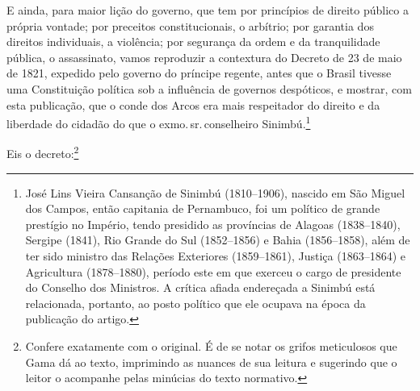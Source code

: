 E ainda, para maior lição do governo, que tem por princípios de direito
público a própria vontade; por preceitos constitucionais, o arbítrio;
por garantia dos direitos individuais, a violência; por segurança da
ordem e da tranquilidade pública, o assassinato, vamos reproduzir a
contextura do Decreto de 23 de maio de 1821, expedido pelo governo do
príncipe regente, antes que o Brasil tivesse uma Constituição política
sob a influência de governos despóticos, e mostrar, com esta publicação,
que o conde dos Arcos era mais respeitador do direito e da liberdade do
cidadão do que o exmo.\,sr.\,conselheiro Sinimbú.\footnote{José Lins
  Vieira Cansanção de Sinimbú (1810--1906), nascido em São Miguel dos
  Campos, então capitania de Pernambuco, foi um político de grande
  prestígio no Império, tendo presidido as províncias de Alagoas
  (1838--1840), Sergipe (1841), Rio Grande do Sul (1852--1856) e Bahia
  (1856--1858), além de ter sido ministro das Relações Exteriores
  (1859--1861), Justiça (1863--1864) e Agricultura (1878--1880), período
  este em que exerceu o cargo de presidente do Conselho dos Ministros. A
  crítica afiada endereçada a Sinimbú está relacionada, portanto, ao
  posto político que ele ocupava na época da publicação do artigo.}

Eis o decreto:\footnote{Confere exatamente com o original. É de se
  notar os grifos meticulosos que Gama dá ao texto, imprimindo as
  nuances de sua leitura e sugerindo que o leitor o acompanhe pelas
  minúcias do texto normativo.}

